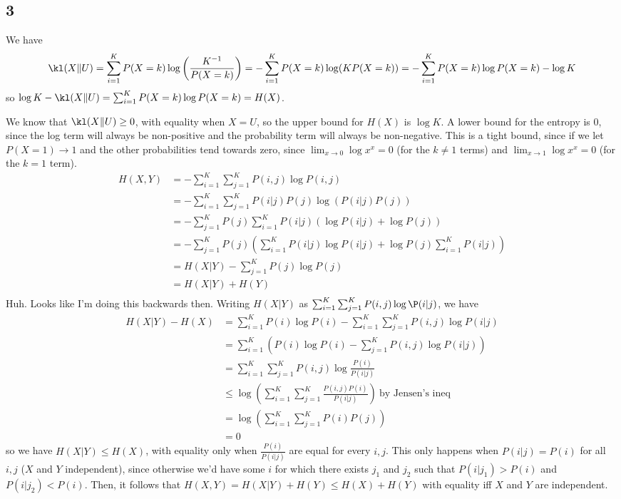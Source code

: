 \documentclass{article}
\begin{document}
\subsection*{3}
We have 
\[\kl(X\|U)=\sum_{i=1}^KP(X=k)\log\left(\frac{K^{-1}}{P(X=k)}\right)=-\sum_{i=1}^KP(X=k)\log(KP(X=k))=-\sum_{i=1}^KP(X=k)\log P(X=k)-\log K\]
so $\log K-\kl(X\|U)=\sum_{i=1}^KP(X=k)\log P(X=k)=H(X)$.

We know that $\kl(X\|U)\geq0$, with equality when $X=U$, so the upper bound for $H(X)$ is $\log K$. A lower bound for the entropy is $0$, since the log term will always be non-positive and the probability term will always be non-negative. This is a tight bound, since if we let $P(X=1)\to1$ and the other probabilities tend towards zero, since $\lim_{x\to0}\log x^x=0$ (for the $k\neq1$ terms) and $\lim_{x\to1}\log x^x=0$ (for the $k=1$ term).
\begin{align*}
    H(X,Y)&=-\sum_{i=1}^K\sum_{j=1}^KP(i,j)\log P(i,j)\\
          &=-\sum_{i=1}^K\sum_{j=1}^KP(i|j)P(j)\log \left(P(i|j)P(j)\right)\\
          &=-\sum_{j=1}^KP(j)\sum_{i=1}^KP(i|j)\left(\log P(i|j) + \log P(j)\right)\\
          &=-\sum_{j=1}^KP(j)\left(\sum_{i=1}^KP(i|j)\log P(i|j)+\log P(j)\sum_{i=1}^KP(i|j)\right)\\
          &=H(X|Y)-\sum_{j=1}^KP(j)\log P(j)\\
          &=H(X|Y)+H(Y)\\
\end{align*}
Huh. Looks like I'm doing this backwards then. Writing $H(X|Y)$ as $\sum_{i=1}^K\sum_{j=1}^KP(i,j)\log \P(i|j)$, we have 
\begin{align*}
    H(X|Y)-H(X)&=\sum_{i=1}^KP(i)\log P(i)-\sum_{i=1}^K\sum_{j=1}^KP(i,j)\log P(i|j)\\
               &=\sum_{i=1}^K \left(P(i)\log P(i)-\sum_{j=1}^KP(i,j)\log P(i|j)\right)\\
               &=\sum_{i=1}^K\sum_{j=1}^KP(i,j)\log\frac{P(i)}{P(i|j)}\\
               &\leq\log\left(\sum_{i=1}^K\sum_{j=1}^K\frac{P(i,j)P(i)}{P(i|j)}\right)\ \text{by Jensen's ineq}\\
               &=\log\left(\sum_{i=1}^K\sum_{j=1}^KP(i)P(j)\right)\\
               &=0
\end{align*}
so we have $H(X|Y)\leq H(X)$, with equality only when $\frac{P(i)}{P(i|j)}$ are equal for every $i,j$. This only happens when $P(i|j)=P(i)$ for all $i,j$ ($X$ and $Y$ independent), since otherwise we'd have some $i$ for which there exists $j_1$ and $j_2$ such that $P(i|j_1)>P(i)$ and $P(i|j_2)<P(i)$. Then, it follows that $H(X,Y)=H(X|Y)+H(Y)\leq H(X)+H(Y)$ with equality iff $X$ and $Y$ are independent.
\end{document}
